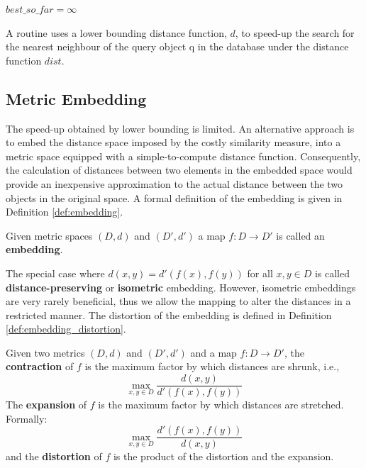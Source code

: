 \begin{algorithm}
$best\_so\_far = \infty$\;
\caption{A routine uses a lower bounding distance function, $d$, to speed-up the search for the nearest neighbour of the query object q in the database under the distance function $dist$.}
\label{alg:lower_bound}
\end{algorithm}

\subsection{Metric Embedding}
\label{subsec:metric_embedding}

\iftoggle{edit-mode}{\hspace{0pt}\marginpar{A different approach}}{}
The speed-up obtained by lower bounding is limited. 
An alternative approach is to embed the distance space imposed by the costly similarity measure, into a metric space equipped with a simple-to-compute distance function. 
Consequently, the calculation of distances between two elements in the embedded space would provide an inexpensive approximation to the actual distance between the two objects in the original space. 
A formal definition of the embedding is given in Definition \ref{def:embedding}.

\begin{definition}
Given metric spaces $(D, d)$ and $(D', d')$ a map $f : D \rightarrow D'$ is called an \textbf{embedding}.
\label{def:embedding}
\end{definition}

\iftoggle{edit-mode}{\hspace{0pt}\marginpar{Isometric embedding}}{}
The special case where $d(x, y) = d'(f(x), f(y))$ for all $x, y \in D$ is called \textbf{distance-preserving} or \textbf{isometric} embedding. However, isometric embeddings are very rarely beneficial, thus we allow the mapping to alter the distances in a restricted manner. The distortion of the embedding is defined in Definition \ref{def:embedding_distortion}.

\begin{definition}
Given two metrics $(D, d)$ and $(D',d')$ and a map $f : D \rightarrow D'$, the \textbf{contraction} of $f$ is the maximum factor by which distances are shrunk, i.e.,
\begin{equation}
\max_{x,y \in D} \frac{d(x,y)}{d'(f(x),f(y))}
\end{equation}
The \textbf{expansion} of $f$ is the maximum factor by which distances are stretched. Formally:
\begin{equation}
\max_{x,y \in D} \frac{d'(f(x),f(y))}{d(x,y)}
\end{equation}
and the \textbf{distortion} of $f$ is the product of the distortion and the expansion.
\label{def:embedding_distortion}
\end{definition}

